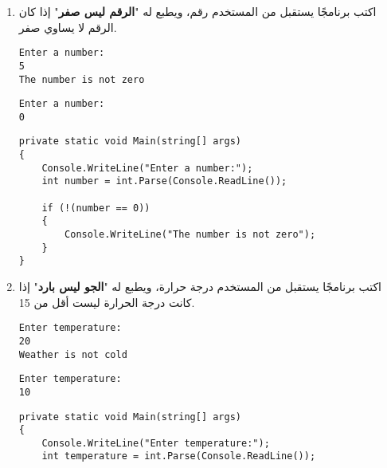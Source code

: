 \documentclass[12pt]{article}
\begin{document}
\begin{enumerate}[itemsep=3em]
\begin{enumerate}[itemsep=3em]
\begin{enumerate}[itemsep=3em]
\begin{enumerate}[itemsep=3em]
\begin{enumerate}[itemsep=3em]
\begin{enumerate}[itemsep=3em]
\begin{enumerate}
\item
اكتب برنامجًا يستقبل من المستخدم رقم، ويطبع له "\textbf{الرقم ليس صفر}" إذا كان الرقم لا يساوي صفر.
\ifdetailed
\begin{example}[1]
\begin{english}
\begin{lstlisting}
Enter a number:
5
The number is not zero
\end{lstlisting}
\end{english}
\end{example}
\begin{example}[2]
\begin{english}
\begin{lstlisting}
Enter a number:
0
\end{lstlisting}
\end{english}
\end{example}

\ifwithsols
\begin{solution}
\begin{english}
\begin{lstlisting}
private static void Main(string[] args)
{
    Console.WriteLine("Enter a number:");
    int number = int.Parse(Console.ReadLine());

    if (!(number == 0))
    {
        Console.WriteLine("The number is not zero");
    }
}
\end{lstlisting}
\end{english}
\end{solution}
\clearpage
\fi
\fi

\item
اكتب برنامجًا يستقبل من المستخدم درجة حرارة، ويطبع له "\textbf{الجو ليس بارد}" إذا كانت درجة الحرارة ليست أقل من 15.
\ifdetailed
\begin{example}[1]
\begin{english}
\begin{lstlisting}
Enter temperature:
20
Weather is not cold
\end{lstlisting}
\end{english}
\end{example}
\begin{example}[2]
\begin{english}
\begin{lstlisting}
Enter temperature:
10
\end{lstlisting}
\end{english}
\end{example}

\ifwithsols
\begin{solution}
\begin{english}
\begin{lstlisting}
private static void Main(string[] args)
{
    Console.WriteLine("Enter temperature:");
    int temperature = int.Parse(Console.ReadLine());


\end{lstlisting}
\end{english}
\end{solution}
\end{enumerate}
\end{enumerate}
\end{enumerate}
\end{enumerate}
\end{enumerate}
\end{enumerate}
\end{enumerate}
\end{document}

